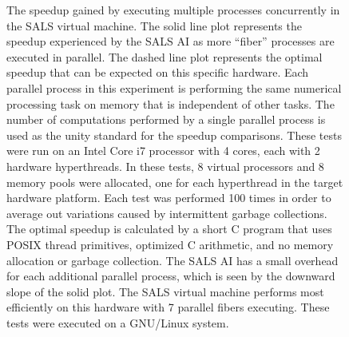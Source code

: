 \begin{figure}
\centering
{}
\caption[The speedup gained by executing multiple processes
  concurrently in the SALS virtual machine.]{The speedup gained by
  executing multiple processes concurrently in the SALS virtual
  machine.  The solid line plot represents the speedup experienced by
  the SALS AI as more ``fiber'' processes are executed in parallel.
  The dashed line plot represents the optimal speedup that can be
  expected on this specific hardware.  Each parallel process in this
  experiment is performing the same numerical processing task on
  memory that is independent of other tasks.  The number of
  computations performed by a single parallel process is used as the
  unity standard for the speedup comparisons.  These tests were run on
  an Intel Core i7 processor with 4 cores, each with 2 hardware
  hyperthreads.  In these tests, 8 virtual processors and 8 memory
  pools were allocated, one for each hyperthread in the target
  hardware platform.  Each test was performed 100 times in order to
  average out variations caused by intermittent garbage collections.
  The optimal speedup is calculated by a short C program that uses
  POSIX thread primitives, optimized C arithmetic, and no memory
  allocation or garbage collection.  The SALS AI has a small overhead
  for each additional parallel process, which is seen by the downward
  slope of the solid plot.  The SALS virtual machine performs most
  efficiently on this hardware with 7 parallel fibers executing.
  These tests were executed on a GNU/Linux system.}
\label{figure:parallel_processing_speedup}
\end{figure}
